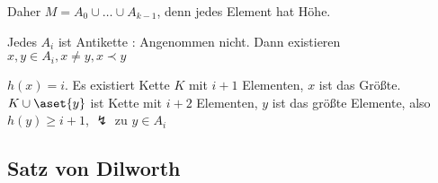 Daher $M = A_0 \cup \dots \cup A_{k-1}$, denn jedes Element hat Höhe.

Jedes $A_i$ ist Antikette : Angenommen nicht. Dann existieren $x, y \in A_i, x \neq y, x \prec y$

$h(x) = i$. Es existiert Kette $K$ mit $i+1$ Elementen, $x$ ist das Größte. $K \cup \aset{y}$ ist Kette mit $i+2$ Elementen, $y$ ist das größte Elemente, also $h(y) \geq i+1$, $\lightning$ zu $y \in A_i$

\subsection{Satz von Dilworth} %






















